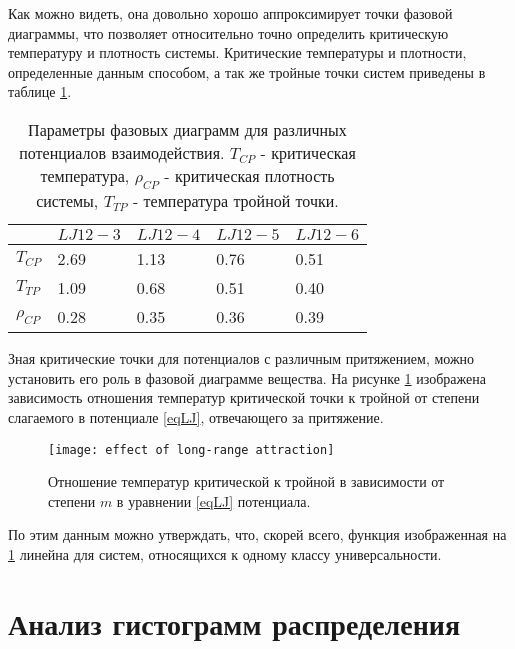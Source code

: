 Как можно видеть, она довольно хорошо аппроксимирует точки фазовой диаграммы, что позволяет относительно точно определить критическую температуру и плотность системы.
Критические температуры и плотности, определенные данным способом, а так же тройные точки систем приведены в таблице \ref{tablSystemConst}.

\begin{table}[h]
\begin{center}
\begin{tabular}{| l | l | l | l | l |}
\hline
    & $LJ12-3$ & $LJ12-4$ & $LJ12-5$ & $LJ12-6$  \\ \hline
$T_{CP}$    & 2.69  &  1.13   &  0.76  &    0.51   \\ \hline
$T_{TP}$    & 1.09  & 0.68    & 0.51   & 0.40   \\ \hline
$\rho_{CP}$ & 0.28  &  0.35   &  0.36   &  0.39   \\ \hline
\end{tabular}
\end{center}
\caption{Параметры фазовых диаграмм для различных потенциалов взаимодействия. $T_{CP}$ - критическая температура, $\rho_{CP}$ - критическая плотность системы, $T_{TP}$ - температура тройной точки.}
\label{tablSystemConst}
\end{table}

Зная критические точки для потенциалов с различным притяжением, можно установить его роль в фазовой диаграмме вещества. На рисунке \ref{risTcpTtp} изображена зависимость отношения температур критической точки к тройной от степени слагаемого в потенциале \ref{eqLJ}, отвечающего за притяжение. 

\begin{figure}[h]
\begin{center}
\texttt{[image: effect of long-range attraction]}
\caption{Отношение температур критической к тройной в зависимости от степени $m$ в уравнении \ref{eqLJ} потенциала.}
\label{risTcpTtp}
\end{center}
\end{figure}

По этим данным можно утверждать, что, скорей всего, функция изображенная на \ref{risTcpTtp} линейна для систем, относящихся к одному классу универсальности.


\section{Анализ гистограмм распределения}\label{C2_3}

